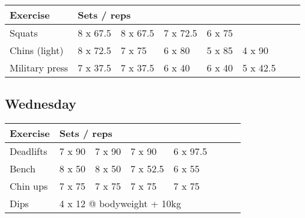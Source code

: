 \documentclass[12pt, a4paper]{article}%
\begin{document}
  \begin{tabular}{l|lllllll}
  \hspace{0.75em} \textbf{Exercise} & \multicolumn{ 7 }{l}{ \textbf{Sets / reps} } \\ \hline

            \hspace{0.75em} Squats
            & 8 x 67.5
            & 8 x 67.5
            & 7 x 72.5
            & 6 x 75
            & 
            & 
            & 
            \\


            \hspace{0.75em} Chins (light)
            & 8 x 72.5
            & 7 x 75
            & 6 x 80
            & 5 x 85
            & 4 x 90
            & 
            & 
            \\


            \hspace{0.75em} Military press
            & 7 x 37.5
            & 7 x 37.5
            & 6 x 40
            & 6 x 40
            & 5 x 42.5
            & 
            & 
            \\


  \end{tabular}

  \subsection*{\hspace{0.5em} Wednesday }


  \begin{tabular}{l|lllllll}
  \hspace{0.75em} \textbf{Exercise} & \multicolumn{ 7 }{l}{ \textbf{Sets / reps} } \\ \hline

            \hspace{0.75em} Deadlifts
            & 7 x 90
            & 7 x 90
            & 7 x 90
            & 6 x 97.5
            & 
            & 
            & 
            \\


            \hspace{0.75em} Bench
            & 8 x 50
            & 8 x 50
            & 7 x 52.5
            & 6 x 55
            & 
            & 
            & 
            \\


            \hspace{0.75em} Chin ups
            & 7 x 75
            & 7 x 75
            & 7 x 75
            & 7 x 75
            & 
            & 
            & 
            \\


   \hspace{0.75em} Dips &  \multicolumn{ 7 }{l}{ 4 x 12 @ bodyweight + 10kg } \\
  \end{tabular}
\end{document}

